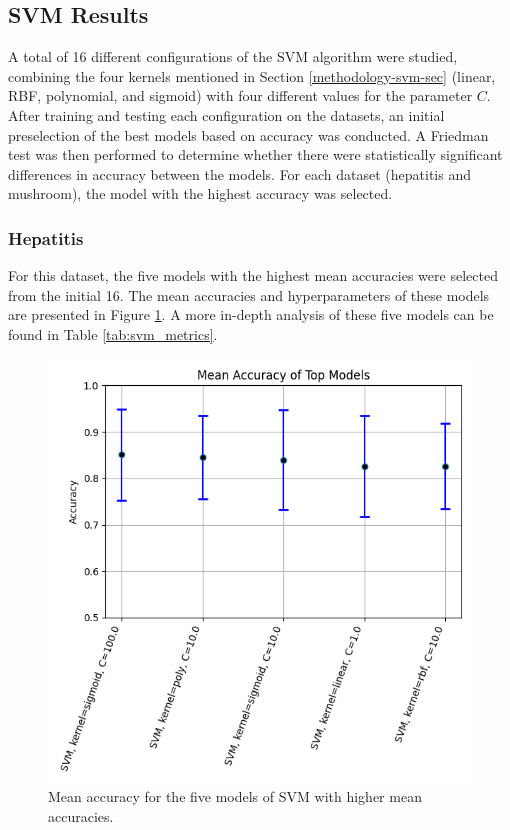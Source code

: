 \subsection{SVM Results} A total of 16 different configurations of the SVM algorithm were studied, combining the four kernels mentioned in Section \ref{methodology-svm-sec} (linear, RBF, polynomial, and sigmoid) with four different values for the parameter $C$. After training and testing each configuration on the datasets, an initial preselection of the best models based on accuracy was conducted. A Friedman test was then performed to determine whether there were statistically significant differences in accuracy between the models. For each dataset (hepatitis and mushroom), the model with the highest accuracy was selected.

\subsubsection{Hepatitis} For this dataset, the five models with the highest mean accuracies were selected from the initial 16. The mean accuracies and hyperparameters of these models are presented in Figure \ref{fig:hep-svm-1}. A more in-depth analysis of these five models can be found in Table \ref{tab:svm_metrics}.

\begin{figure}[t]
    \centering
    \includegraphics[width=\textwidth]{figures/svm/hepatitis/statistical_analysis_results.png}
    \caption{Mean accuracy for the five models of SVM with higher mean accuracies.}
    \label{fig:hep-svm-1}
\end{figure}


